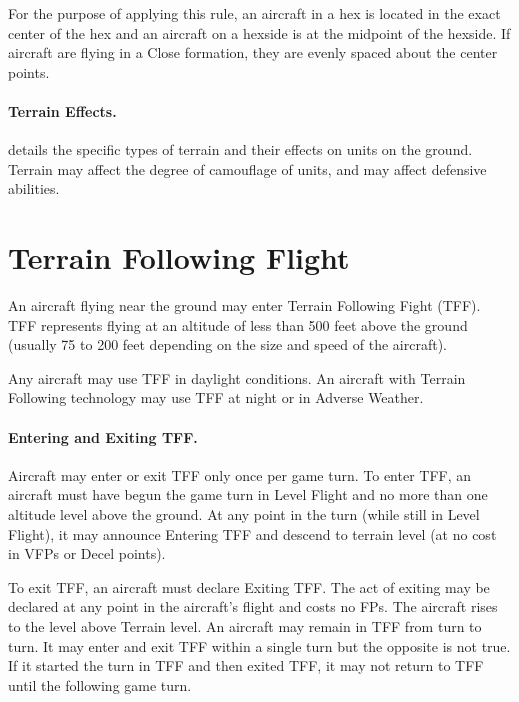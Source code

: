 For the purpose of applying this rule, an aircraft in a hex is located in the exact center of the hex and an aircraft on a hexside is at the midpoint of the hexside. If aircraft are flying in a Close formation, they are evenly spaced about the center points.


\paragraph{Terrain Effects\protect{}.}  details the specific types of terrain and their effects on units on the ground. Terrain may affect the degree of camouflage of units, and may affect defensive abilities.

\section{Terrain Following Flight}
\label{rule:terrain-following-flight}

An aircraft flying near the ground may enter Terrain Following Fight (TFF). TFF represents flying at an altitude of less than 500 feet above the ground (usually 75 to 200 feet depending on the size and speed of the aircraft).

Any aircraft may use TFF in daylight conditions. An aircraft with Terrain Following technology may use TFF at night or in Adverse Weather.

\paragraph{Entering and Exiting TFF.} Aircraft may enter or exit TFF only once per game turn. To enter TFF, an aircraft must have begun the game turn in Level Flight and no more than one altitude level above the ground. At any point in the turn (while still in Level Flight), it may announce Entering TFF and descend to terrain level (at no cost in VFPs or Decel points).

To exit TFF, an aircraft must declare Exiting TFF. The act of exiting may be declared at any point in the aircraft's flight and costs no FPs. The aircraft rises to the level above Terrain level. An aircraft may remain in TFF from turn to turn. It may enter and exit TFF within a single turn but the opposite is not true.  If it started the turn in TFF and then exited TFF, it may not return to TFF until the following game turn. 


